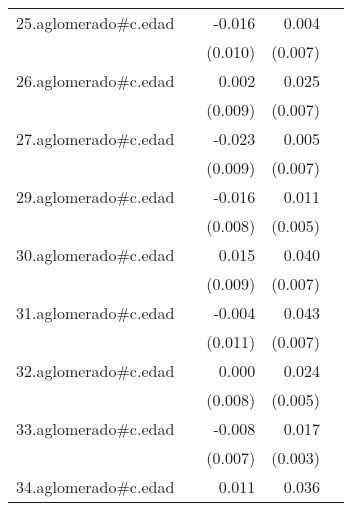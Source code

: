 {\begin{longtable}{l*{4}{D{.}{.}{-1}}}
\addlinespace
25.aglomerado#c.edad&                     &      -0.016         &       0.004         &                     \\
            &                     &     (0.010)         &     (0.007)         &                     \\
\addlinespace
26.aglomerado#c.edad&                     &       0.002         &       0.025\sym{***}&                     \\
            &                     &     (0.009)         &     (0.007)         &                     \\
\addlinespace
27.aglomerado#c.edad&                     &      -0.023\sym{*}  &       0.005         &                     \\
            &                     &     (0.009)         &     (0.007)         &                     \\
\addlinespace
29.aglomerado#c.edad&                     &      -0.016         &       0.011\sym{*}  &                     \\
            &                     &     (0.008)         &     (0.005)         &                     \\
\addlinespace
30.aglomerado#c.edad&                     &       0.015         &       0.040\sym{***}&                     \\
            &                     &     (0.009)         &     (0.007)         &                     \\
\addlinespace
31.aglomerado#c.edad&                     &      -0.004         &       0.043\sym{***}&                     \\
            &                     &     (0.011)         &     (0.007)         &                     \\
\addlinespace
32.aglomerado#c.edad&                     &       0.000         &       0.024\sym{***}&                     \\
            &                     &     (0.008)         &     (0.005)         &                     \\
\addlinespace
33.aglomerado#c.edad&                     &      -0.008         &       0.017\sym{***}&                     \\
            &                     &     (0.007)         &     (0.003)         &                     \\
\addlinespace
34.aglomerado#c.edad&                     &       0.011         &       0.036\sym{***}&                     \\

\end{longtable}}
